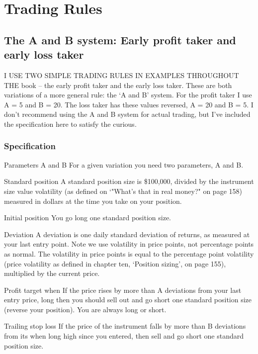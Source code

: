 \chapter{Trading Rules}

\section*{The A and B system: Early profit taker and early loss taker}  {}

I USE TWO SIMPLE TRADING RULES IN EXAMPLES THROUGHOUT THE book -- the early profit taker and the early loss taker. These are both variations of a more general rule: the ‘A and B' system. For the profit taker I use A = 5 and B = 20. The loss taker has these values reversed, A = 20 and B = 5. I don't recommend using the A and B system for actual trading, but I've included the specification here to satisfy the curious.

\subsection*{Specification}

Parameters A and B For a given variation you need two parameters, A and B.

Standard position A standard position size is \$100,000, divided by the instrument size value volatility (as defined on ‘"What's that in real money?" on page 158) measured in dollars at the time you take on your position.

Initial position You go long one standard position size.

Deviation A deviation is one daily standard deviation of returns, as measured at your last entry point. Note we use volatility in price points, not percentage points as normal. The volatility in price points is equal to the percentage point volatility (price volatility as defined in chapter ten, ‘Position sizing', on page 155), multiplied by the current price.

Profit target when If the price rises by more than A deviations from your last entry price, long then you should sell out and go short one standard position size (reverse your position). You are always long or short.

Trailing stop loss If the price of the instrument falls by more than B deviations from its when long high since you entered, then sell and go short one standard position size.

